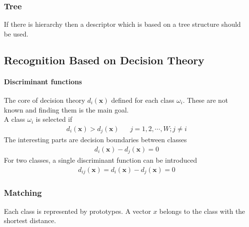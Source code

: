 \subsubsection{Tree}
If there is hierarchy then a descriptor which is based on a tree structure
should be used.

\subsection{Recognition Based on Decision Theory}
\paragraph{Discriminant functions}
The core of decision theory $d_i(\mathbf{x})$ defined for each class $\omega_i$.
These are not known and finding them is the main goal. \\

A class $\omega_i$ is selected if
\begin{align*}
d_i(\mathbf{x}) > d_j(\mathbf{x}) && j=1,2, \cdots, W; j \neq i
\end{align*}
The interesting parts are decision boundaries between classes
\begin{align*}
	d_i(\mathbf{x}) - d_j(\mathbf{x}) = 0
\end{align*}
For two classes, a single discriminant function can be introduced
\begin{align*}
	d_{ij}(\mathbf{x}) = d_i(\mathbf{x}) - d_j(\mathbf{x}) = 0
\end{align*}

\subsubsection{Matching}
Each class is represented by prototypes.
A vector $x$ belongs to the class with the shortest distance.

